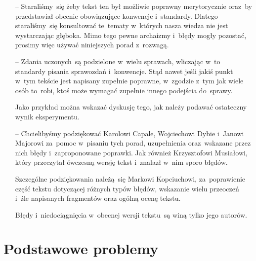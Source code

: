 \documentclass[a4paper,11pt]{article}
\begin{document}
\begin{itemize}
\item[--] Staraliśmy~się żeby tekst ten był możliwie poprawny
  merytorycznie oraz~by przedstawiał obecnie obowiązujące konwencje
  i~standardy. Dlatego staraliśmy~się konsultować te~tematy w~których
  nasza wiedza nie jest wystarczając głęboka. Mimo tego pewne
  archaizmy i~błędy mogły pozostać, prosimy więc używać niniejszych
  porad z~rozwagą.

\item[--] Zdania uczonych~są podzielone w~wielu sprawach, wliczając
  w~to standardy pisania sprawozdań i~konwencje. Stąd nawet jeśli
  jakiś punkt w~tym tekście jest napisany zupełnie poprawne, w~zgodzie
  z~tym jak wiele osób to~robi, ktoś może wymagać zupełnie innego
  podejścia do~sprawy.

  Jako przykład można wskazać dyskusję tego, jak należy podawać
  ostateczny wynik eksperymentu.

\item[--] Chcielibyśmy podziękować Karolowi Capale, Wojciechowi Dybie
  i~Janowi Majorowi za~pomoc w~pisaniu tych porad, uzupełnienia
  oraz~wskazane przez nich błędy i~zaproponowane poprawki. Jak również
  Krzysztofowi Musiałowi, który przeczytał ówczesną wersję tekst
  i~znalazł w~nim sporo błędów.

  Szczególne podziękowania należą~się Markowi Kopciuchowi,
  za~poprawienie część tekstu dotyczącej różnych typów błędów,
  wskazanie wielu przeoczeń i~źle napisanych fragmentów oraz ogólną
  ocenę tekstu.

  Błędy i~niedociągnięcia w~obecnej wersji tekstu~są winą tylko jego
  autorów.
\end{itemize}





\section{Podstawowe problemy}
\label{sec:podstawowe}
\end{document}
